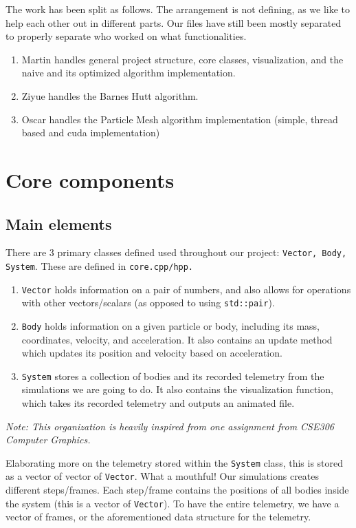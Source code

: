 \documentclass{article}
\begin{document}
The work has been split as follows. The arrangement is not defining, as we like to help each other out in different parts. Our files have still been mostly separated to properly separate who worked on what functionalities.
\begin{enumerate}
    \item Martin handles general project structure, core classes, visualization, and the naive and its optimized algorithm implementation.
    \item Ziyue handles the Barnes Hutt algorithm.
    \item Oscar handles the Particle Mesh algorithm implementation (simple, thread based and cuda implementation)
\end{enumerate}


\section{Core components}

\subsection{Main elements}

There are 3 primary classes defined used throughout our project: \texttt{Vector, Body, System}. These are defined in \texttt{core.cpp/hpp.}
\begin{enumerate}
    \item \texttt{Vector} holds information on a pair of numbers, and also allows for operations with other vectors/scalars (as opposed to using \texttt{std::pair}).
    \item \texttt{Body} holds information on a given particle or body, including its mass, coordinates, velocity, and acceleration. It also contains an update method which updates its position and velocity based on acceleration. 
    \item \texttt{System} stores a collection of bodies and its recorded telemetry from the simulations we are going to do. It also contains the visualization function, which takes its recorded telemetry and outputs an animated file.
\end{enumerate} 
\textit{Note: This organization is heavily inspired from one assignment from CSE306 Computer Graphics.}

Elaborating more on the telemetry stored within the \texttt{System} class, this is stored as a vector of vector of \texttt{Vector}. What a mouthful! Our simulations creates different steps/frames. Each step/frame contains the positions of all bodies inside the system (this is a vector of \texttt{Vector}). To have the entire telemetry, we have a vector of frames, or the aforementioned data structure for the telemetry.
\end{document}
